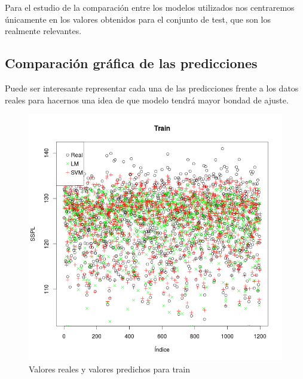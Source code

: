 Para el estudio de la comparación entre los modelos utilizados nos centraremos únicamente en los valores obtenidos para el conjunto de test, que son los realmente relevantes.

\subsection{Comparación gráfica de las predicciones}

Puede ser interesante representar cada una de las predicciones frente a los datos reales para hacernos una idea de que modelo tendrá mayor bondad de ajuste.


\begin{figure}[H]
\centering
\includegraphics[scale=0.40]{predicciones_train.png}
\caption{Valores reales y valores predichos para train}
\label{}
\end{figure}



